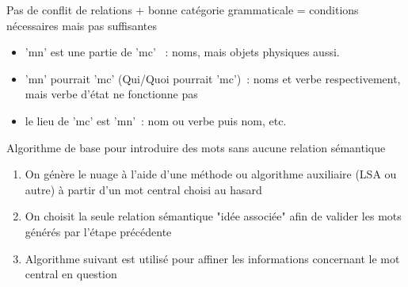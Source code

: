 \documentclass{beamer}
\begin{document}
\begin{frame}
  Pas de conflit de relations + bonne catégorie grammaticale = conditions nécessaires mais pas suffisantes 
  \begin{itemize}
  \item 'mn' est une partie de 'mc'~ : noms, mais objets physiques aussi. 
  \item 'mn' pourrait 'mc' (Qui/Quoi pourrait 'mc')~: noms et verbe respectivement, mais verbe d'état ne fonctionne pas
  \item le lieu de 'mc' est 'mn'~: nom ou verbe puis nom, etc.
  \end{itemize} 
\end{frame}


\begin{frame}
  Algorithme de base pour introduire des mots sans aucune relation sémantique 
  \begin{enumerate}
  \item On génère le nuage à l'aide d'une méthode ou algorithme auxiliaire (LSA ou autre) à partir d'un mot central choisi au hasard
  \item On choisit la seule relation sémantique "idée associée" afin de valider les mots générés par l'étape précédente
  \item Algorithme suivant est utilisé pour affiner les informations concernant le mot central en question
  \end{enumerate} 
\end{frame}


\begin{frame}
  \begin{figure}
  \end{figure}
\end{frame}
\end{document}
